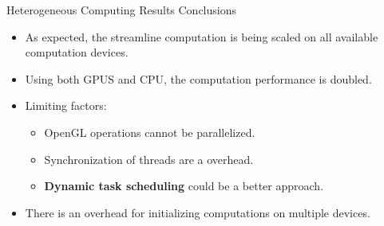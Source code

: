 \documentclass{beamer}
\begin{document}
\begin{frame}{Heterogeneous Computing Results Conclusions}
	\begin{itemize}
		\item As expected, the streamline computation is being scaled on all available computation devices.
		\item Using both GPUS and CPU, the computation performance is doubled.
		\item Limiting factors:\\
			\begin{itemize}
				\item OpenGL operations cannot be parallelized.
				\item Synchronization of threads are a overhead.
				\item \textbf{Dynamic task scheduling} could be a better approach.				
			\end{itemize}
		\item There is an overhead for initializing computations on multiple devices.
	\end{itemize}
\end{frame}
\end{document}
